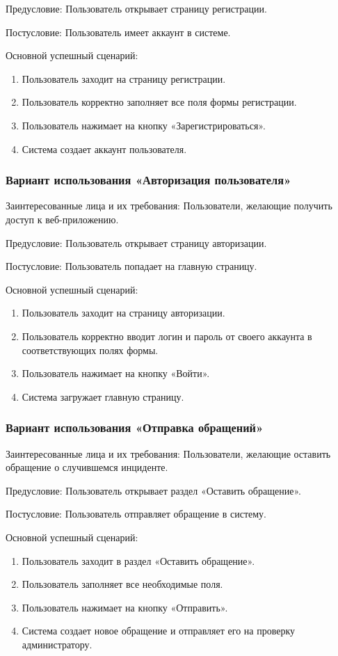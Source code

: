 Предусловие: Пользователь открывает страницу регистрации.

Постусловие: Пользователь имеет аккаунт в системе.

Основной успешный сценарий: 
\begin{enumerate}
\item Пользователь заходит на страницу регистрации.
\item Пользователь корректно заполняет все поля формы регистрации.
\item Пользователь нажимает на кнопку «Зарегистрироваться».
\item Система создает аккаунт пользователя.
\end{enumerate}

\subsubsection {Вариант использования «Авторизация пользователя»}
Заинтересованные лица и их требования: Пользователи, желающие получить доступ к веб-приложению.

Предусловие: Пользователь открывает страницу авторизации.

Постусловие: Пользователь попадает на главную страницу.

Основной успешный сценарий: 
\begin{enumerate}
	\item Пользователь заходит на страницу авторизации.
	\item Пользователь корректно вводит логин и пароль от своего аккаунта в соответствующих полях формы.
	\item Пользователь нажимает на кнопку «Войти».
	\item Система загружает главную страницу.
\end{enumerate}

\subsubsection {Вариант использования «Отправка обращений»}

Заинтересованные лица и их требования: Пользователи, желающие оставить обращение о случившемся инциденте.

Предусловие: Пользователь открывает раздел «Оставить обращение».

Постусловие: Пользователь отправляет обращение в систему.

Основной успешный сценарий: 

\begin{enumerate}
	\item Пользователь заходит в раздел «Оставить обращение».
	\item Пользователь заполняет все необходимые поля.
	\item Пользователь нажимает на кнопку «Отправить».
	\item Система создает новое обращение и отправляет его на проверку администратору.
\end{enumerate}

